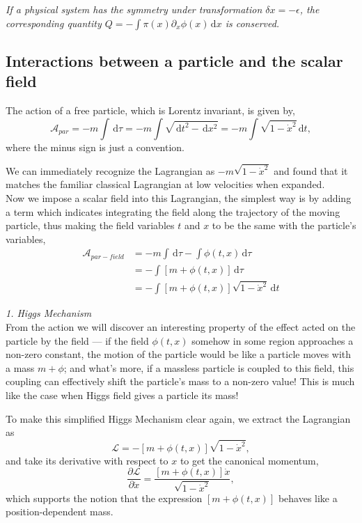 \documentclass{article}
\newcommand{\be}{\begin{equation}}
\newcommand{\ee}{\end{equation}}
\newcommand{\dif}{\,\mathrm{d}}
\newcommand{\p}{\partial}
\newcommand{\1}{\left}
\newcommand{\2}{\right}
\newcommand{\ma}{\mathcal}
\begin{document}
\textit{If a physical system has the symmetry under transformation $\delta x=-\epsilon$, the corresponding quantity $Q=-\int \pi(x) \p_x\phi(x) \dif x$ is conserved.}


\subsection{Interactions between a particle and the scalar field}

The action of  a free particle, which is Lorentz invariant, is given by,
\be 
\ma A_{par} = -m \int \dif \tau = -m \int \sqrt{\dif t^2 - \dif x^2} = -m \int \sqrt{1-\dot x^2} \dif t,
\ee
where the minus sign is just a convention.

We can immediately recognize the Lagrangian as $-m \sqrt{1-\dot x^2}$ and found that it matches the familiar classical Lagrangian at low velocities when expanded. \\

Now we impose a scalar field into this Lagrangian, the simplest way is by adding a term which indicates integrating the field along the trajectory of the moving particle, thus making the field variables $t$ and $x$ to be the same with the particle's variables,
\be
\begin{split}
\ma A_{par-field} &=-m\int\dif\tau-\int\phi(t,x)\dif\tau\\
&= -\int [m+\phi(t,x)] \dif \tau \\
&=- \int [m+\phi(t,x)] \sqrt{1-\dot x^2} \dif t
\end{split}
\ee

\textsl{1. Higgs Mechanism}\\

From the action we will discover an interesting property of the effect acted on the particle by the field --- if the field $\phi(t,x)$ somehow in some region approaches a non-zero constant, the motion of the particle would be like a particle moves with a mass $m+\phi$; and what's more, if a massless particle is coupled to this field, this coupling can effectively shift the particle's mass to a non-zero value! This is much like the case when Higgs field gives a particle its mass!


To make this simplified Higgs Mechanism clear again, we extract the Lagrangian as
\be
\ma L = -[m+\phi(t,x)]\sqrt{1-\dot x^2},
\ee
and take its derivative with respect to $x$ to get the canonical momentum,
\be
\frac{\p\ma L}{\p \dot x} = \frac{[m+\phi(t,x)] \dot x}{\sqrt{1-\dot x^2}},
\ee
which supports the notion that the expression $[m+\phi(t,x)]$ behaves like a position-dependent mass.\\
\end{document}
